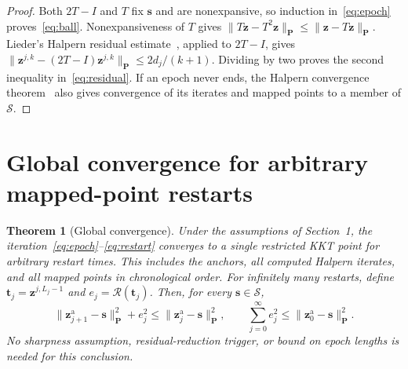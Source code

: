 \documentclass[11pt]{article}
\newtheorem{theorem}{Theorem}[section]
\theoremstyle{remark}
\newcommand{\np}[1]{\lVert#1\rVert_{\mathbf P}}
\newcommand{\res}{\mathcal R}
\begin{document}
\begin{proof}
Both $2T-I$ and $T$ fix $\mathbf s$ and are nonexpansive, so induction in~\eqref{eq:epoch} proves~\eqref{eq:ball}.
Nonexpansiveness of $T$ gives $\np{T\mathbf z-T^2\mathbf z}\leq\np{\mathbf z-T\mathbf z}$.
Lieder's Halpern residual estimate~\cite[Theorem~2.1]{lieder2021}, applied to $2T-I$, gives $\np{\mathbf z^{j,k}-(2T-I)\mathbf z^{j,k}}\leq2d_j/(k+1)$.
Dividing by two proves the second inequality in~\eqref{eq:residual}.
If an epoch never ends, the Halpern convergence theorem~\cite{wittmann1992} also gives convergence of its iterates and mapped points to a member of $\mathcal S$.
\end{proof}

\section{Global convergence for arbitrary mapped-point restarts}

\begin{theorem}[Global convergence]
\label{thm:global}
Under the assumptions of Section~1, the iteration~\eqref{eq:epoch}--\eqref{eq:restart} converges to a single restricted KKT point for arbitrary restart times.
This includes the anchors, all computed Halpern iterates, and all mapped points in chronological order.
For infinitely many restarts, define $\mathbf t_j=\mathbf z^{j,L_j-1}$ and $e_j=\res(\mathbf t_j)$.
Then, for every $\mathbf s\in\mathcal S$,
\begin{equation}
\np{\mathbf z_{j+1}^{\mathrm a}-\mathbf s}^2+e_j^2\leq\np{\mathbf z_j^{\mathrm a}-\mathbf s}^2,\qquad \sum_{j=0}^{\infty}e_j^2\leq\np{\mathbf z_0^{\mathrm a}-\mathbf s}^2.
\label{eq:descent}
\end{equation}
No sharpness assumption, residual-reduction trigger, or bound on epoch lengths is needed for this conclusion.
\end{theorem}
\end{document}
